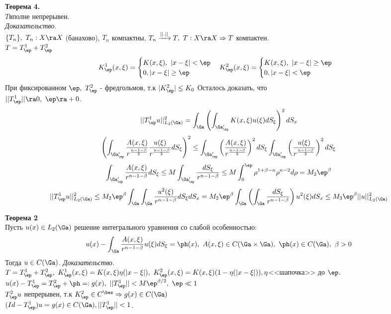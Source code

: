 \documentclass[a4paper,draft]{article}
\begin{document}
\textbf{Теорема 4.}\\
 $T$\т вполне непрерывен.\\
\textit{Доказательство.}\\
$\{T_n\}, \ T_n: X\ra X\ $(банахово), $T_n$ компактны, $T_n\xrightarrow{||.||} T,\
T:X\ra X\Rightarrow T$ компактен.\\
$T=T_\ep^1+T_\ep^2$
$$
K_\ep^1(x,\xi)=
\begin{cases}
K(x,\xi),\ |x-\xi|<\ep\\
0,|x-\xi|\ge\ep
\end{cases}
K_\ep^2(x,\xi)=
\begin{cases}
K(x,\xi),\ |x-\xi|\ge\ep\\
0,|x-\xi|<\ep
\end{cases}
$$
При фиксированном $\ep,\ T_\ep^2$ - фредгольмов, т.к $|K_\ep^2|\le K_0$
Осталось доказать, что \\ $||T_\ep^1||\ra 0,\ \ep\ra +0$.
$$
||T_\ep^1u||_{L_2(\Ga)}^2=
\int_\Ga
\left(
\int_{\Ga'_\ep}K(x,\xi)u(\xi)dS_\xi
\right)^2dS_x
$$
$$
\left(
\int_{\Ga'_\ep} \frac{A(x,\xi)}{r^{\frac{n-1-\beta}{2}}}
\frac{u(\xi)}{r^{\frac{n-1-\beta}{2}}}dS_\xi
\right)^2\le
\int_{\Ga'_\ep} \left(\frac{A(x,\xi)}{r^{\frac{n-1-\beta}{2}}}\right)^2dS_\xi
\int_{\Ga'_\ep} \left(\frac{u(\xi)}{r^{\frac{n-1-\beta}{2}}}\right)^2dS_\xi
$$
$$
\int_{\Ga'_\ep}\frac{A(x,\xi)}{r^{n-1-\beta}}dS_\xi\le
M\int_{\Ga'_\ep} \frac{dS_\xi}{r^{n-1-\beta}}
\le M\int_0^\ep \rho^{1+\beta-n}\rho^{n-2}d\rho=M_2\ep^\beta
$$
$$
||T_\ep^1u||_{L_2(\Ga)}^2\le
M_2\ep^\beta
\int_\Ga\int_\Ga\frac{u^2(\xi)}{r^{n-1-\beta}}dS_\xi dS_x=
M_2\ep^\beta
\int_\Ga
\left(\int_\Ga\frac{dS_\xi}{r^{n-1-\beta}}\right) u^2(\xi)dS_x\le
M_3\ep^\beta||u||_{L_2(\Ga)}^2
$$

\textbf{Теорема 2}\\
Пусть $u(x)\in L_2(\Ga)$ решение интегрального уравнения со слабой особенностью:
$$
u(x)-\int_\Ga\frac{A(x,\xi)}{r^{n-1-\beta}}u(\xi)dS_\xi=\ph(x),\
A(x,\xi)\in C(\Ga\times\Ga),\ \ph(x)\in C(\Ga),\ \beta>0
$$
Тогда $u\in C(\Ga)$.
\textit{Доказательство.}\\
$T=T_\ep^1+T_\ep^2,\ K_\ep^1(x,\xi)=K(x,\xi)\eta(|x-\xi|),\
K_\ep^2(x,\xi)=K(x,\xi)(1-\eta(|x-\xi|)),\\ \eta$\т <<шапочка>> до $\ep$.
$u(x)-T_\ep^1=T_\ep^2+\ph=:g(x),\ ||T_\ep^1||
<M\ep^{\beta/2},\ \ep\ll1$\\
$T_\ep^2u $ непрерывен, т.к $K_\ep^2\in C^\bes
\Rightarrow g(x)\in C(\Ga)$\\
$(Id-T_\ep^1)u=g(x)\in C(\Ga),||T_\ep^1||<1$.
\end{document}
